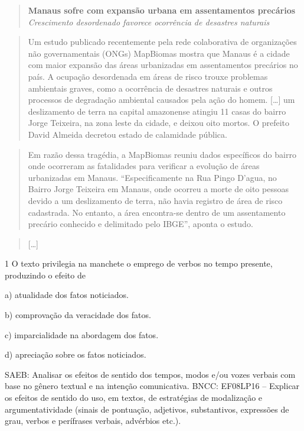 \begin{quote}
\textbf{Manaus sofre com expansão urbana em assentamentos precários}
\emph{Crescimento desordenado favorece ocorrência de desastres naturais}
\end{quote}

\begin{quote}
Um estudo publicado recentemente pela rede colaborativa de organizações
não governamentais (ONGs) MapBiomas mostra que Manaus é a cidade com
maior expansão das áreas urbanizadas em assentamentos precários no país.
A ocupação desordenada em áreas de risco trouxe problemas ambientais
graves, como a ocorrência de desastres naturais e outros processos de
degradação ambiental causados pela ação do homem. {[}\ldots{]} um
deslizamento de terra na capital amazonense atingiu 11 casas do bairro
Jorge Teixeira, na zona leste da cidade, e deixou oito mortos. O
prefeito David Almeida decretou estado de calamidade pública.
\end{quote}

\begin{quote}
Em razão dessa tragédia, a MapBiomas reuniu dados específicos do bairro
onde ocorreram as fatalidades para verificar a evolução de áreas
urbanizadas em Manaus. ``Especificamente na Rua Pingo D'agua, no Bairro
Jorge Teixeira em Manaus, onde ocorreu a morte de oito pessoas devido a
um deslizamento de terra, não havia registro de área de risco
cadastrada. No entanto, a área encontra-se dentro de um assentamento
precário conhecido e delimitado pelo IBGE'', aponta o estudo.
\end{quote}

\begin{quote}
{[}\ldots{]}
\end{quote}


\num{1} O texto privilegia na manchete o emprego de verbos no tempo
presente, produzindo o efeito de

a) atualidade dos fatos noticiados.

b) comprovação da veracidade dos fatos.

c) imparcialidade na abordagem dos fatos.

d) apreciação sobre os fatos noticiados.

SAEB: Analisar os efeitos de sentido dos tempos, modos e/ou vozes
verbais com base no gênero textual e na intenção comunicativa. BNCC:
EF08LP16 -- Explicar os efeitos de sentido do uso, em textos, de
estratégias de modalização e argumentatividade (sinais de pontuação,
adjetivos, substantivos, expressões de grau, verbos e perífrases
verbais, advérbios etc.).

